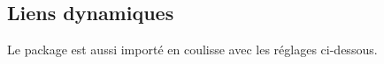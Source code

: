 


\usepackage{../macroenv/macroenv}
\usepackage{../listing/listing}
\usepackage{../inenglish/inenglish}


\usepackage[lang = FR]{main}





\subsection{Liens dynamiques}

Le package  est aussi importé en coulisse avec les réglages ci-dessous.

\begin{doclatex-alone}
\hypersetup{
    colorlinks,
    citecolor = orange!75!black,
    filecolor = orange!75!black,
    linkcolor = orange!75!black,
    urlcolor  = orange!75!black
}
\end{doclatex-alone}



